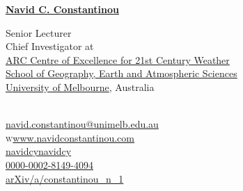 \documentclass[10pt, letter]{article}
\def\www{http://www.navidconstantinou.com}
\newcommand{\sgeas}{
\href{https://sgeas.unimelb.edu.au}{\color{black}School of Geography, Earth and Atmospheric Sciences}}
\newcommand{\unimelb}{
\href{https://www.unimelb.edu.au}{\color{black}University of Melbourne}}
\begin{document}
\reversemarginpar
{\huge{ \href{http://www.navidconstantinou.com}{\color{jhublue}\bf Navid C. Constantinou}}}\\[.42cm]
\parbox{.63\linewidth}{
Senior Lecturer\\
Chief Investigator at\\
\hspace*{1em}\href{https://www.21centuryweather.org.au}{\color{black}ARC Centre of Excellence for 21st Century Weather}\\
\sgeas\\
\unimelb, Australia\\
\mbox{}\\
}
\parbox{.37\linewidth}{
{}\hspace{.26cm}\href{mailto:navid.constantinou@unimelb.edu.au}{navid.constantinou@unimelb.edu.au}\\
\textsc{w}\hspace{.24cm}\href{\www}{www.navidconstantinou.com}\\
\faGithub\hspace{.24cm}\href{https://github.com/navidcy}{navidcy}\hspace{3.9em}\faVimeo\hspace{.24cm}\href{https://vimeo.com/navidcy}{navidcy}\\
{}\hspace{.24cm}\href{http://orcid.org/0000-0002-8149-4094}{0000-0002-8149-4094}\\
{}\hspace{.24cm}\href{https://arxiv.org/a/constantinou_n_1.html}{arXiv/a/constantinou\_n\_1}}






%
%
%
\end{document}
